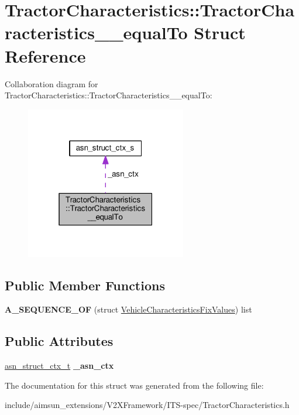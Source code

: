 \hypertarget{structTractorCharacteristics_1_1TractorCharacteristics____equalTo}{}\section{Tractor\+Characteristics\+:\+:Tractor\+Characteristics\+\_\+\+\_\+equal\+To Struct Reference}
\label{structTractorCharacteristics_1_1TractorCharacteristics____equalTo}


Collaboration diagram for Tractor\+Characteristics\+:\+:Tractor\+Characteristics\+\_\+\+\_\+equal\+To\+:\nopagebreak
\begin{figure}[H]
\begin{center}
\leavevmode
\includegraphics[width=199pt]{structTractorCharacteristics_1_1TractorCharacteristics____equalTo__coll__graph}
\end{center}
\end{figure}
\subsection*{Public Member Functions}
\begin{DoxyCompactItemize}
\item 
{\bfseries A\+\_\+\+S\+E\+Q\+U\+E\+N\+C\+E\+\_\+\+OF} (struct \hyperlink{structVehicleCharacteristicsFixValues}{Vehicle\+Characteristics\+Fix\+Values}) list\hypertarget{structTractorCharacteristics_1_1TractorCharacteristics____equalTo_a53dcedeb81369a8322aafb0224874431}{}\label{structTractorCharacteristics_1_1TractorCharacteristics____equalTo_a53dcedeb81369a8322aafb0224874431}

\end{DoxyCompactItemize}
\subsection*{Public Attributes}
\begin{DoxyCompactItemize}
\item 
\hyperlink{structasn__struct__ctx__s}{asn\+\_\+struct\+\_\+ctx\+\_\+t} {\bfseries \+\_\+asn\+\_\+ctx}\hypertarget{structTractorCharacteristics_1_1TractorCharacteristics____equalTo_a44686340df09856fb479981419d35b5e}{}\label{structTractorCharacteristics_1_1TractorCharacteristics____equalTo_a44686340df09856fb479981419d35b5e}

\end{DoxyCompactItemize}


The documentation for this struct was generated from the following file\+:\begin{DoxyCompactItemize}
\item 
include/aimsun\+\_\+extensions/\+V2\+X\+Framework/\+I\+T\+S-\/spec/Tractor\+Characteristics.\+h\end{DoxyCompactItemize}
